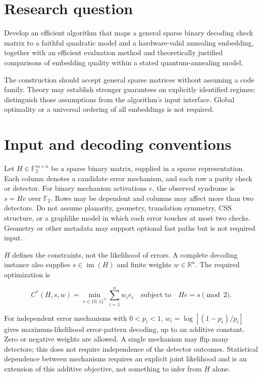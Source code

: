 \documentclass[11pt,letterpaper]{article}
\begin{document}
\section{Research question}

Develop an efficient algorithm that maps a general sparse binary decoding check matrix to a faithful quadratic model and a hardware-valid annealing embedding, together with an efficient evaluation method and theoretically justified comparisons of embedding quality within a stated quantum-annealing model.\par

The construction should accept general sparse matrices without assuming a code family. Theory may establish stronger guarantees on explicitly identified regimes; distinguish those assumptions from the algorithm's input interface. Global optimality or a universal ordering of all embeddings is not required.\par

\section{Input and decoding conventions}

Let $H\in\mathbb F_2^{m\times n}$ be a sparse binary matrix, supplied in a sparse representation. Each column denotes a candidate error mechanism, and each row a parity check or detector. For binary mechanism activations $e$, the observed syndrome is $s=He$ over $\mathbb F_2$. Rows may be dependent and columns may affect more than two detectors. Do not assume planarity, geometry, translation symmetry, CSS structure, or a graphlike model in which each error touches at most two checks. Geometry or other metadata may support optional fast paths but is not required input.\par

$H$ defines the constraints, not the likelihood of errors. A complete decoding instance also supplies $s\in\operatorname{im}(H)$ and finite weights $w\in\mathbb R^n$. The required optimization is\par

\[C^*(H,s,w)=\min_{e\in\{0,1\}^n}\sum_{i=1}^n w_i e_i\quad\text{subject to}\quad He=s\pmod 2.\]

For independent error mechanisms with $0<p_i<1$, $w_i=\log[(1-p_i)/p_i]$ gives maximum-likelihood error-pattern decoding, up to an additive constant. Zero or negative weights are allowed. A single mechanism may flip many detectors; this does not require independence of the detector outcomes. Statistical dependence between mechanisms requires an explicit joint likelihood and is an extension of this additive objective, not something to infer from $H$ alone.\par
\end{document}
